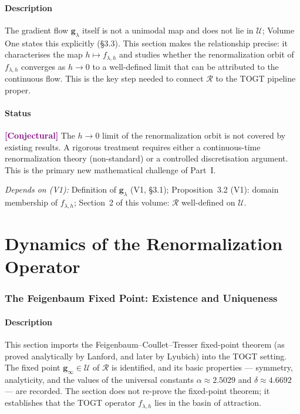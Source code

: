 \documentclass[11pt]{article}
\newcommand{\conjectural}{\textcolor{purple}{\textbf{[Conjectural]}}}
\newcommand{\depends}[1]{\smallskip\noindent\textit{Depends on (V1):} #1.\smallskip}
\newcommand{\g}{\boldsymbol{g}}
\begin{document}
\subsection*{Description}
The gradient flow $\g_\lambda$ itself is not a unimodal map and does not
lie in $\mathcal{U}$; Volume One states this explicitly (\S3.3). This
section makes the relationship precise: it characterises the map
$h \mapsto f_{\lambda,h}$ and studies whether the renormalization orbit of
$f_{\lambda,h}$ converges as $h \to 0$ to a well-defined limit that can be
attributed to the continuous flow. This is the key step needed to connect
$\mathcal{R}$ to the TOGT pipeline proper.

\subsection*{Status}
\conjectural{} The $h \to 0$ limit of the renormalization orbit is not
covered by existing results. A rigorous treatment requires either a
continuous-time renormalization theory (non-standard) or a controlled
discretisation argument. This is the primary new mathematical challenge of
Part~I.

\depends{Definition of $\g_\lambda$ (V1, \S3.1);
Proposition~3.2 (V1): domain membership of $f_{\lambda,h}$;
Section~2 of this volume: $\mathcal{R}$ well-defined on $\mathcal{U}$}

\part{Dynamics of the Renormalization Operator}

\section{The Feigenbaum Fixed Point: Existence and Uniqueness}

\subsection*{Description}
This section imports the Feigenbaum--Coullet--Tresser fixed-point theorem
(as proved analytically by Lanford, and later by Lyubich) into the TOGT
setting. The fixed point $\g_\infty \in \mathcal{U}$ of $\mathcal{R}$ is
identified, and its basic properties --- symmetry, analyticity, and the
values of the universal constants $\alpha \approx 2.5029$ and
$\delta \approx 4.6692$ --- are recorded. The section does not re-prove
the fixed-point theorem; it establishes that the TOGT operator
$f_{\lambda,h}$ lies in the basin of attraction.
\end{document}
